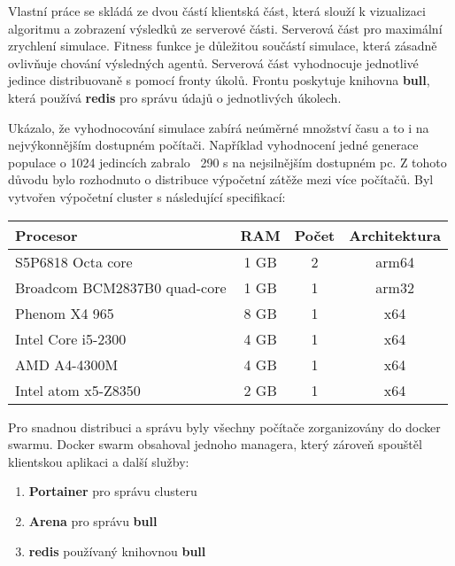 Vlastní práce se skládá ze dvou částí klientská část, která slouží k vizualizaci algoritmu a zobrazení výsledků ze serverové části. Serverová část pro maximální zrychlení simulace. 
Fitness funkce je důležitou součástí simulace, která zásadně ovlivňuje chování výsledných agentů.
Serverová část vyhodnocuje jednotlivé jedince distribuovaně s pomocí fronty úkolů. Frontu poskytuje knihovna \textbf{bull}, která používá \textbf{redis} pro správu údajů o jednotlivých úkolech.

Ukázalo, že vyhodnocování simulace zabírá neúměrné množství času a to i na nejvýkonnějším dostupném počítači. 
Například vyhodnocení jedné generace populace o 1024 jedincích zabralo ~290 s na nejsilnějším dostupném pc. Z tohoto důvodu bylo rozhodnuto o distribuce výpočetní zátěže mezi více počítačů. Byl vytvořen výpočetní cluster s následující specifikací:

\begin{tabular}{|l|c|c|c|}
	\hline 
	Procesor & RAM & Počet & Architektura\\ 
	\hline 
	S5P6818 Octa core & 1 GB & 2 & arm64 \\ 
	\hline 
	Broadcom BCM2837B0 quad-core & 1 GB & 1 & arm32 \\ 
	\hline 
	Phenom X4 965 & 8 GB & 1 & x64 \\ 
	\hline
	Intel Core i5-2300 & 4 GB & 1 & x64 \\ 
	\hline
	AMD A4-4300M & 4 GB & 1 & x64 \\ 
	\hline 
	Intel atom x5-Z8350 & 2 GB & 1 & x64 \\ 
	\hline
\end{tabular} 

Pro snadnou distribuci a správu byly všechny počítače zorganizovány do docker swarmu. Docker swarm obsahoval jednoho managera, který zároveň spouštěl klientskou aplikaci a další služby:

\begin{enumerate}
	\item \textbf{Portainer} pro správu clusteru
	\item \textbf{Arena} pro správu \textbf{bull}
	\item \textbf{redis} používaný knihovnou \textbf{bull}
\end{enumerate}

